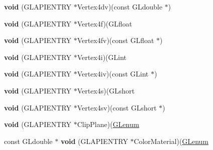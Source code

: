 \begin{DoxyCompactItemize}
\mbox{\label{struct_____g_ldispatch_table_rec_a542362aaa7c04bfc1d8e11fd1445a078}} 
{\bfseries void} (G\+L\+A\+P\+I\+E\+N\+T\+RY $\ast$Vertex4dv)(const G\+Ldouble $\ast$)
\item 
\mbox{\label{struct_____g_ldispatch_table_rec_a2a14b2e5bcc815e2eef7d4915084e819}} 
{\bfseries void} (G\+L\+A\+P\+I\+E\+N\+T\+RY $\ast$Vertex4f)(G\+Lfloat
\item 
\mbox{\label{struct_____g_ldispatch_table_rec_a0806009978450b1f75606ffe1d1c0490}} 
{\bfseries void} (G\+L\+A\+P\+I\+E\+N\+T\+RY $\ast$Vertex4fv)(const G\+Lfloat $\ast$)
\item 
\mbox{\label{struct_____g_ldispatch_table_rec_ab4c0900ac7113ae60b272ca5a4f1f8c0}} 
{\bfseries void} (G\+L\+A\+P\+I\+E\+N\+T\+RY $\ast$Vertex4i)(G\+Lint
\item 
\mbox{\label{struct_____g_ldispatch_table_rec_a7ce2770f2244aec13229c2c3e4287689}} 
{\bfseries void} (G\+L\+A\+P\+I\+E\+N\+T\+RY $\ast$Vertex4iv)(const G\+Lint $\ast$)
\item 
\mbox{\label{struct_____g_ldispatch_table_rec_aad29b0413887ad298a3b672bdc60260d}} 
{\bfseries void} (G\+L\+A\+P\+I\+E\+N\+T\+RY $\ast$Vertex4s)(G\+Lshort
\item 
\mbox{\label{struct_____g_ldispatch_table_rec_a743bf86c3d9833ba59cab999c673a394}} 
{\bfseries void} (G\+L\+A\+P\+I\+E\+N\+T\+RY $\ast$Vertex4sv)(const G\+Lshort $\ast$)
\item 
\mbox{\label{struct_____g_ldispatch_table_rec_ab1db4eff11309a0a5205db484f3386f4}} 
{\bfseries void} (G\+L\+A\+P\+I\+E\+N\+T\+RY $\ast$Clip\+Plane)(\hyperlink{interfacevoid}{G\+Lenum}
\item 
\mbox{\label{struct_____g_ldispatch_table_rec_a9c938d2a5a62f9eec9522cb54af43916}} 
const G\+Ldouble $\ast$ {\bfseries void} (G\+L\+A\+P\+I\+E\+N\+T\+RY $\ast$Color\+Material)(\hyperlink{interfacevoid}{G\+Lenum}

\end{DoxyCompactItemize}
